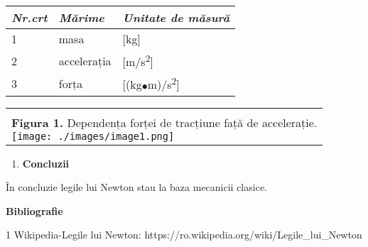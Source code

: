\documentclass[11pt]{article}
\begin{document}
	\begin{table}[H]
	\begin{adjustbox}{max width=\textwidth}
	\begin{tabular}{p{2.0cm}p{7.0cm}p{7.0cm}}
	\hline
	\multicolumn{1}{|p{2.0cm}}{\textit{Nr.crt}} & 
	\multicolumn{1}{|p{7.0cm}}{\textit{Mărime}} & 
	\multicolumn{1}{|p{7.0cm}|}{\textit{Unitate de măsură}} \\ 
	\hline
	\multicolumn{1}{|p{2.0cm}}{1} & 
	\multicolumn{1}{|p{7.0cm}}{masa} & 
	\multicolumn{1}{|p{7.0cm}|}{[kg]} \\ 
	\hline
	\multicolumn{1}{|p{2.0cm}}{2} & 
	\multicolumn{1}{|p{7.0cm}}{accelerația} & 
	\multicolumn{1}{|p{7.0cm}|}{[m/s\textsuperscript{2}]} \\ 
	\hline
	\multicolumn{1}{|p{2.0cm}}{3} & 
	\multicolumn{1}{|p{7.0cm}}{forța} & 
	\multicolumn{1}{|p{7.0cm}|}{[(kg{\scriptsize $\bullet$}m)/s\textsuperscript{2}]} \\ 
	\hline
	\end{tabular}
	\end{adjustbox}
	\end{table}
	\begin{table}[H]
	\begin{adjustbox}{max width=\textwidth}
	\begin{tabular}{p{15.9cm}}
	\multicolumn{1}{p{15.9cm}}{} \\ 
	\multicolumn{1}{p{15.9cm}}{\centering
	\textbf{Figura 1.} Dependența forței de tracțiune față de accelerație. \newline
	\centering
	\texttt{[image: ./images/image1.png]}
	} \\ 
	\end{tabular}
	\end{adjustbox}
	\end{table}
	\vspace{4\baselineskip}
	\begin{enumerate}
		\item \textbf{Concluzii}
	
	\end{enumerate}
	În concluzie legile lui Newton stau la baza mecanicii clasice.
	
	\textbf{Bibliografie}
	
	1 Wikipedia-Legile lui Newton: https://ro.wikipedia.org/wiki/Legile\_lui\_Newton
	
	
	
\end{document}
